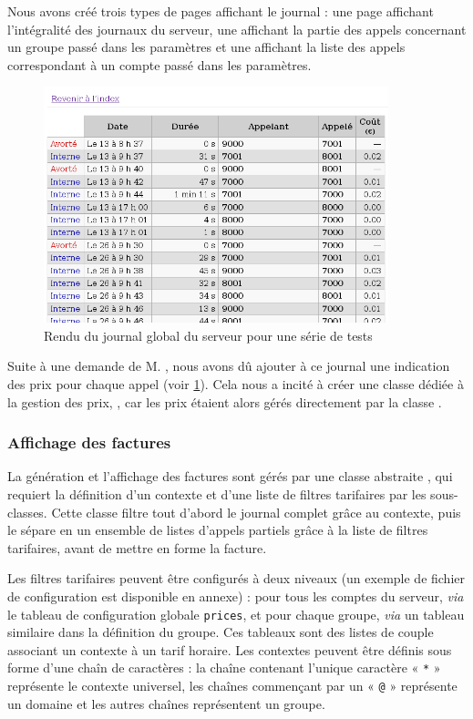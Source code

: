 Nous avons créé trois types de pages affichant le journal : une page affichant l’intégralité des journaux du serveur, une affichant la partie des appels concernant un groupe passé dans les paramètres et une affichant la liste des appels correspondant à un compte passé dans les paramètres.

\begin{figure}[H]
\begin{center}
\includegraphics[width=10cm]{images/journal-global.png}
\end{center}
\label{imgjournal}
\caption{Rendu du journal global du serveur pour une série de tests}
\end{figure}

Suite à une demande de M. , nous avons dû ajouter à ce journal une indication des prix pour chaque appel (voir \cref{imgjournal}). Cela nous a incité à créer une classe dédiée à la gestion des prix, , car les prix étaient alors gérés directement par la classe .

\newpage

\subsubsection{Affichage des factures}

La génération et l’affichage des factures sont gérés par une classe abstraite , qui requiert la définition d’un contexte et d’une liste de filtres tarifaires par les sous-classes. Cette classe filtre tout d’abord le journal complet grâce au contexte, puis le sépare en un ensemble de listes d’appels partiels grâce à la liste de filtres tarifaires, avant de mettre en forme la facture.

Les filtres tarifaires peuvent être configurés à deux niveaux (un exemple de fichier de configuration est disponible en annexe) : pour tous les comptes du serveur, \textit{via} le tableau de configuration globale \texttt{prices}, et pour chaque groupe, \textit{via} un tableau similaire dans la définition du groupe. Ces tableaux sont des listes de couple associant un contexte à un tarif horaire. Les contextes peuvent être définis sous forme d’une chaîn de caractères : la chaîne contenant l’unique caractère « \texttt{*} » représente le contexte universel, les chaînes commençant par un « \texttt{@} » représente un domaine et les autres chaînes représentent un groupe.

